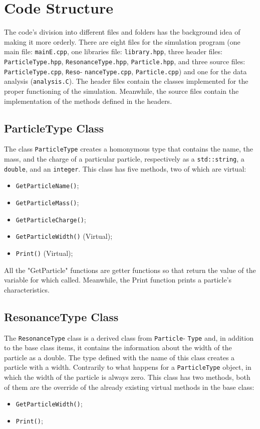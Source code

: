 \documentclass[a4paper, 11pt]{article}
\begin{document}
    \section{Code Structure}
      The code's division into different files and folders has the background idea of making it more orderly. There are eight files for the simulation program (one main file: \verb|mainE.cpp|, one libraries file: \verb|library.hpp|, three header files: \verb|ParticleType.hpp|, \verb|ResonanceType.hpp|, \verb|Particle.hpp|, and three source files: \verb|ParticleType.cpp|, \verb|Reso|- \verb|nanceType.cpp|, \verb|Particle.cpp|) and one for the data analysis (\verb|analysis.C|).
      The header files contain the classes implemented for the proper functioning of the simulation. Meanwhile, the source files contain the implementation of the methods defined in the headers.
      \subsection*{ParticleType Class}
      The class \verb|ParticleType| creates a homonymous type that contains the name, the mass, and the charge of a particular particle, respectively as a \verb|std::string|, a \verb|double|, and an \verb|integer|. This class has five methods, two of which are virtual:
      \begin{itemize}
        \item{\verb|GetParticleName()|; }
        \item{\verb|GetParticleMass()|; }
        \item{\verb|GetParticleCharge()|; }
        \item{\verb|GetParticleWidth()| (Virtual); }
        \item{\verb|Print()| (Virtual); }
      \end{itemize}

      All the "GetParticle" functions are getter functions so that return the value of the variable for which called. Meanwhile, the Print function prints a particle's characteristics.
      \subsection* {ResonanceType Class}
      The \verb|ResonanceType| class is a derived class from \verb|Particle|- \verb|Type| and, in addition to the base class items, it contains the information about the width of the particle as a double. The type defined with the name of this class creates a particle with a width. Contrarily to what happens for a \verb|ParticleType| object, in which the width of the particle is always zero. This class has two methods, both of them are the override of the already existing virtual methods in the base class:
      \begin{itemize}
        \item{\verb|GetParticleWidth()|; }
        \item{\verb|Print()|; }
      \end{itemize}
\end{document}

